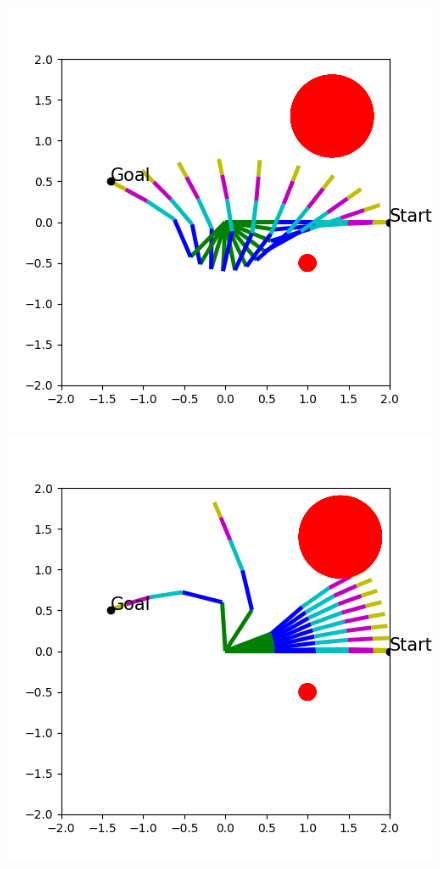 \begin{figure}[htbp]
\begin{minipage}[!h]{0.32\columnwidth}
\begin{center}
      \includegraphics[width=1.0\columnwidth]{figs/5dof_with_obstacle}
    \end{center}
  \end{minipage}
  \begin{minipage}[!h]{0.32\columnwidth}
    \begin{center}
      \includegraphics[width=1.0\columnwidth]{figs/5dof_with_obstacle_fail}

\end{center}
\end{minipage}
\end{figure}
